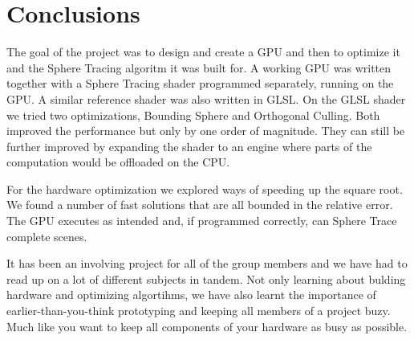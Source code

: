 \chapter{Conclusions}

The goal of the project was to design and create a GPU and then to optimize it
and the Sphere Tracing algoritm it was built for. A working GPU was written
together with a Sphere Tracing shader programmed separately, running on the
GPU. A similar reference shader was also written in GLSL. On the GLSL shader we
tried two optimizations, Bounding Sphere and Orthogonal Culling. Both improved
the performance but only by one order of magnitude. They can still be further
improved by expanding the shader to an engine where parts of the computation
would be offloaded on the CPU. 

For the hardware optimization we explored ways of speeding up the square root.
We found a number of fast solutions that are all bounded in the relative error.
The GPU executes as intended and, if programmed correctly, can Sphere Trace
complete scenes. 

It has been an involving project for all of the group members and we have had
to read up on a lot of different subjects in tandem. Not only learning about
bulding hardware and optimizing algortihms, we have also learnt the importance
of earlier-than-you-think prototyping and keeping all members of a project
buzy. Much like you want to keep all components of your hardware as busy as
possible.
